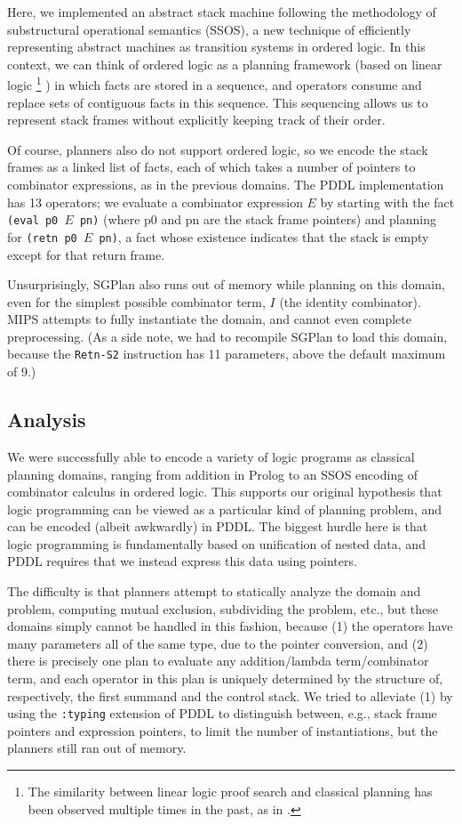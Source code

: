 Here, we implemented an abstract stack machine following the methodology of
substructural operational semantics (SSOS), a new technique of efficiently
representing abstract machines as transition systems in ordered logic. In this
context, we can think of ordered logic as a planning framework (based on linear
logic%
\footnote{The similarity between linear logic proof search and classical
planning has been observed multiple times in the past, as in \cite{Dixon}.}%
) in which facts are stored in a sequence, and operators consume and
replace sets of contiguous facts in this sequence. This sequencing allows us to
represent stack frames without explicitly keeping track of their order.



Of course, planners also do not support ordered logic, so we encode the stack
frames as a linked list of facts, each of which takes a number of pointers to
combinator expressions, as in the previous domains. The PDDL implementation has
13 operators; we evaluate a combinator expression $E$ by starting with the fact
\texttt{(eval p0 $E$ pn)} (where p0 and pn are the stack frame pointers) and
planning for \texttt{(retn p0 $E$ pn)}, a fact whose existence indicates that
the stack is empty except for that return frame.

Unsurprisingly, SGPlan also runs out of memory while planning on this domain,
even for the simplest possible combinator term, $I$ (the identity combinator).
MIPS attempts to fully instantiate the domain, and cannot even complete
preprocessing. (As a side note, we had to recompile SGPlan to load this domain,
because the \texttt{Retn-S2} instruction has 11 parameters, above the default
maximum of 9.)

\subsection{Analysis}

We were successfully able to encode a variety of logic programs as classical
planning domains, ranging from addition in Prolog to an SSOS encoding of
combinator calculus in ordered logic. This supports our original hypothesis that
logic programming can be viewed as a particular kind of planning problem, and
can be encoded (albeit awkwardly) in PDDL. The biggest hurdle here is that logic
programming is fundamentally based on unification of nested data, and PDDL
requires that we instead express this data using pointers.

The difficulty is that planners attempt to statically analyze the domain and
problem, computing mutual exclusion, subdividing the problem, etc., but these
domains simply cannot be handled in this fashion, because (1) the operators have
many parameters all of the same type, due to the pointer conversion, and (2)
there is precisely one plan to evaluate any addition/lambda term/combinator
term, and each operator in this plan is uniquely determined by the structure of,
respectively, the first summand and the control stack. We tried to alleviate (1)
by using the \texttt{:typing} extension of PDDL to distinguish between, e.g.,
stack frame pointers and expression pointers, to limit the number of
instantiations, but the planners still ran out of memory.

